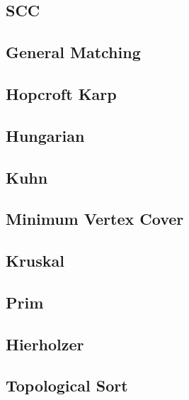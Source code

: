 \subsection{SCC}
\raggedbottom
\hrulefill
\subsection{General Matching}
\raggedbottom
\hrulefill
\subsection{Hopcroft Karp}
\raggedbottom
\hrulefill
\subsection{Hungarian}
\raggedbottom
\hrulefill
\subsection{Kuhn}
\raggedbottom
\hrulefill
\subsection{Minimum Vertex Cover}
\raggedbottom
\hrulefill
\subsection{Kruskal}
\raggedbottom
\hrulefill
\subsection{Prim}
\raggedbottom
\hrulefill
\subsection{Hierholzer}
\raggedbottom
\hrulefill
\subsection{Topological Sort}
\raggedbottom
\hrulefill
